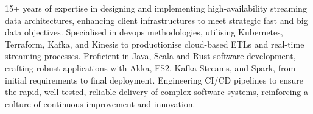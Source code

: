 

\begin{cvparagraph}

15+ years of expertise in designing and implementing high-availability streaming data architectures, enhancing client infrastructures to meet strategic fast and big data objectives.
Specialised in devops methodologies, utilising Kubernetes, Terraform, Kafka, and Kinesis to productionise cloud-based ETLs and real-time streaming processes.
Proficient in Java, Scala and Rust software development, crafting robust applications with Akka, FS2, Kafka Streams, and Spark, from initial requirements to final deployment.
Engineering CI/CD pipelines to ensure the rapid, well tested, reliable delivery of complex software systems, reinforcing a culture of continuous improvement and innovation.
\end{cvparagraph}
